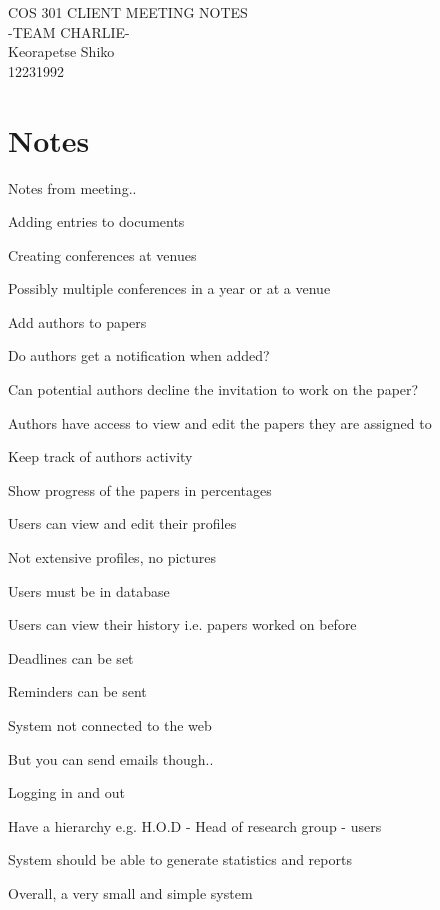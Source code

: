\documentclass{article}
\begin{document}
		\begin{titlepage}
				\begin{center}
				\huge
				
					COS 301 
					CLIENT MEETING NOTES \\
					-TEAM CHARLIE- \\
					Keorapetse Shiko \\
					12231992\\
					
				\end{center}
		\end{titlepage}
		
		\newpage
		
		\section{Notes}
		
		Notes from meeting..
		
		\begin{list}{•}{•}
		
			
		
				\item Adding entries to documents
				\item Creating conferences at venues
				\item Possibly multiple conferences in a year or at a venue
				\item Add authors to papers
				\item Do authors get a notification when added?
				\item Can potential authors decline the invitation to work on the paper?
				\item Authors have access to view and edit the papers they are assigned to
				\item Keep track of authors activity
				\item Show progress of the papers in percentages
				\item Users can view and edit their profiles
				\item Not extensive profiles, no pictures
				\item Users must be in database
				\item Users can view their history i.e. papers worked on before
				\item Deadlines can be set
				\item Reminders can be sent
				\item System not connected to the web
				\item But you can send emails though..
				\item Logging in  and out
				\item Have a hierarchy e.g. H.O.D - Head of research group - users
				\item System should be able to generate statistics and reports 
				\item Overall, a very small and simple system
				
		\end{list}
\end{document}
